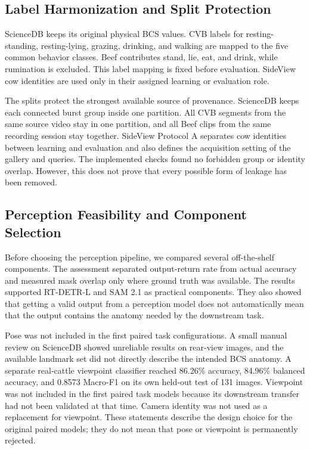 \subsection{Label Harmonization and Split Protection}

ScienceDB keeps its original physical BCS values. CVB labels for resting-standing, resting-lying, grazing, drinking, and walking are mapped to the five common behavior classes. Beef contributes stand, lie, eat, and drink, while rumination is excluded. This label mapping is fixed before evaluation. SideView cow identities are used only in their assigned learning or evaluation role.



The splits protect the strongest available source of provenance. ScienceDB keeps each connected burst group inside one partition. All CVB segments from the same source video stay in one partition, and all Beef clips from the same recording session stay together. SideView Protocol A separates cow identities between learning and evaluation and also defines the acquisition setting of the gallery and queries. The implemented checks found no forbidden group or identity overlap. However, this does not prove that every possible form of leakage has been removed.

\subsection{Perception Feasibility and Component Selection}

Before choosing the perception pipeline, we compared several off-the-shelf components. The assessment separated output-return rate from actual accuracy and measured mask overlap only where ground truth was available. The results supported RT-DETR-L and SAM 2.1 as practical components. They also showed that getting a valid output from a perception model does not automatically mean that the output contains the anatomy needed by the downstream task.



Pose was not included in the first paired task configurations. A small manual review on ScienceDB showed unreliable results on rear-view images, and the available landmark set did not directly describe the intended BCS anatomy. A separate real-cattle viewpoint classifier reached 86.26\% accuracy, 84.96\% balanced accuracy, and 0.8573 Macro-F1 on its own held-out test of 131 images. Viewpoint was not included in the first paired task models because its downstream transfer had not been validated at that time. Camera identity was not used as a replacement for viewpoint. These statements describe the design choice for the original paired models; they do not mean that pose or viewpoint is permanently rejected.


